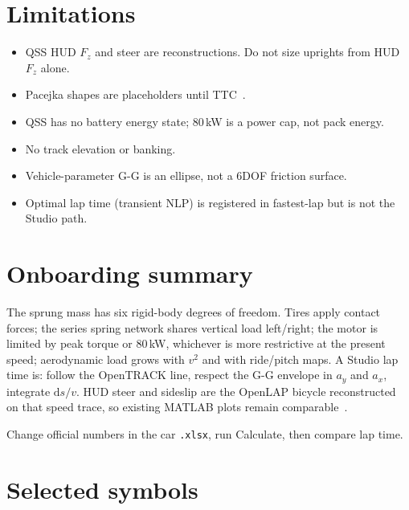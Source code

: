 \documentclass[11pt,letterpaper]{article}
\begin{document}
\section{Limitations}
\label{sec:limits}

\begin{itemize}[leftmargin=1.6em]
  \item QSS HUD $F_z$ and steer are reconstructions. Do not size
        uprights from HUD $F_z$ alone.
  \item Pacejka shapes are placeholders until TTC~\cite{ttc}.
  \item QSS has no battery energy state; 80\,\si{\kilo\watt} is a power
        cap, not pack energy.
  \item No track elevation or banking.
  \item Vehicle-parameter G-G is an ellipse, not a 6DOF friction
        surface.
  \item Optimal lap time (transient NLP) is registered in fastest-lap
        but is not the Studio path.
\end{itemize}

\section{Onboarding summary}
\label{sec:onboard}

The sprung mass has six rigid-body degrees of freedom. Tires apply
contact forces; the series spring network shares vertical load
left/right; the motor is limited by peak torque or
80\,\si{\kilo\watt}, whichever is more restrictive at the present
speed; aerodynamic load grows with $v^2$ and with ride/pitch maps. A
Studio lap time is: follow the OpenTRACK line, respect the G-G
envelope in $a_y$ and $a_x$, integrate $\mathrm{d}s/v$. HUD steer and
sideslip are the OpenLAP bicycle reconstructed on that speed trace, so
existing MATLAB plots remain comparable~\cite{jones-linkedin,openlap}.

Change official numbers in the car \texttt{.xlsx}, run Calculate, then
compare lap time.




\appendix
\section{Selected symbols}
\end{document}
